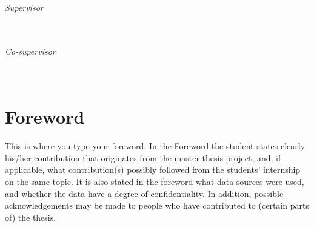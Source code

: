 \documentclass{amsart}
\theoremstyle{plain}
\newcommand{\frontmatter}{
    \pagenumbering{roman}   %
}
\begin{document}
\begin{titlepage}
\vspace{2cm}
\noindent
\LARGE
\thesisAuthor\\
\vspace{.2 cm}
\small
\par \noindent
\thesisDegree
\par \noindent
\university
\par \noindent
\thesisPlaceDate


\vspace{4cm}
\begin{flushright}
\emph{Supervisor} \\
\textbf{\supervisor} \\
\departmentSUP \\
\universitySUP
\end{flushright}

\vspace{.5cm}
\begin{flushright}
\emph{Co-supervisor} \\
\textbf{\cosupervisor} \\
\departmentCOSUP \\
\universityCOSUP
\end{flushright}


\end{titlepage}


\clearpage\thispagestyle{empty}
\newpage
\mbox{}
\clearpage
\newpage
\frontmatter


\section*{Foreword}
This is where you type your foreword.
In the Foreword the student states clearly his/her contribution that originates from the master thesis project, and, if applicable, what contribution(s) possibly followed from the students' internship on the same topic.
It is also stated in the foreword what data sources were used, and whether the data have a degree of confidentiality.
In addition, possible acknowledgements may be made to people who have contributed to (certain parts of) the thesis.


\newpage
\end{document}
